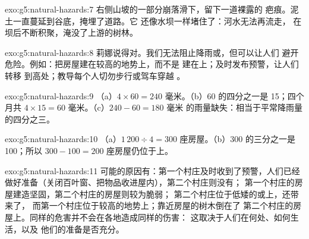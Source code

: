 \begin{solution}{exo:g5:natural-hazards:7}
右侧山坡的一部分崩落滑下，留下一道裸露的
疤痕。泥土一直蔓延到谷底，掩埋了道路。它
还像水坝一样堵住了：河水无法再流走，
在坝后不断积聚，淹没了上游的树林。
\end{solution}

\begin{solution}{exo:g5:natural-hazards:8}
莉娜说得对。我们无法阻止降雨或，但可以让人们
避开危险。例如：把房屋建在较高的地势上，而不是
建在上；及时发布预警，让人们转移
到高处；教导每个人切勿步行或驾车穿越
。
\end{solution}

\begin{solution}{exo:g5:natural-hazards:9}
（a）$4 \times 60 = 240$ 毫米。（b）60 的四分之一是 15；四个
月共 $4 \times 15 = 60$ 毫米。（c）$240 - 60 = 180$ 毫米
的雨量缺失：相当于平常降雨量的四分之三。
\end{solution}

\begin{solution}{exo:g5:natural-hazards:10}
（a）$1\,200 \div 4 = 300$ 座房屋。（b）300 的三分之一是 100；所以
$300 - 100 = 200$ 座房屋仍位于上。
\end{solution}

\begin{solution}{exo:g5:natural-hazards:11}
可能的原因有：第一个村庄及时收到了预警，人们已经
做好准备（关闭百叶窗、把物品收进屋内），第二个村庄则没有；
第一个村庄的房屋建造坚固，第二个村庄的房屋则较为脆弱；
第二个村庄位于低矮的或上，还带来了，
而第一个村庄位于较高的地势上；靠近房屋的树木倒在了
第二个村庄的房屋上。同样的危害并不会在各地造成同样的伤害：
这取决于人们在何处、如何生活，以及
他们的准备是否充分。
\end{solution}
